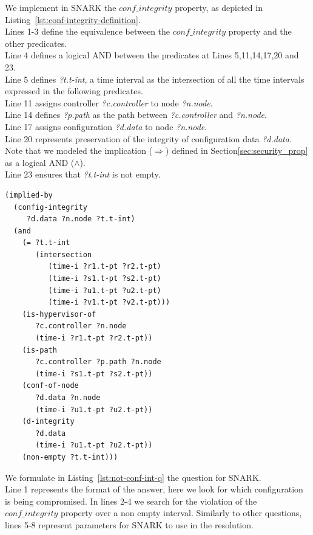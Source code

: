 We implement in SNARK the $conf\_integrity$ property, as depicted in Listing~\ref{lst:conf-integrity-definition}.\\
Lines 1-3 define the equivalence between the $conf\_integrity$ property and the other predicates.\\
Line 4 defines a logical AND between the predicates at Lines 5,11,14,17,20 and 23.\\
Line 5 defines \textit{?t.t-int}, a time interval as the intersection of all the time intervals expressed in the following predicates.\\
Line 11 assigns controller \textit{?c.controller} to node \textit{?n.node}.\\
Line 14 defines \textit{?p.path} as the path between \textit{?c.controller} and \textit{?n.node}.\\
Line 17 assigns configuration \textit{?d.data} to node \textit{?n.node}.\\
Line 20 represents preservation of the integrity of configuration data \textit{?d.data}.\\
Note that we modeled the implication ($\Rightarrow$) defined in Section\ref{sec:security_prop} as a logical AND (\ie $\wedge$).\\
Line 23 ensures that \textit{?t.t-int} is not empty.

\begin{lstlisting}[caption=SNARK definition of the configuration integrity., label=lst:conf-integrity-definition,captionpos=b] 
(implied-by
  (config-integrity 
     ?d.data ?n.node ?t.t-int)
  (and
    (= ?t.t-int
       (intersection
    	  (time-i ?r1.t-pt ?r2.t-pt)
    	  (time-i ?s1.t-pt ?s2.t-pt)
    	  (time-i ?u1.t-pt ?u2.t-pt)
    	  (time-i ?v1.t-pt ?v2.t-pt)))
    (is-hypervisor-of
       ?c.controller ?n.node 
       (time-i ?r1.t-pt ?r2.t-pt))
    (is-path 
	   ?c.controller ?p.path ?n.node
       (time-i ?s1.t-pt ?s2.t-pt))
    (conf-of-node
	   ?d.data ?n.node
       (time-i ?u1.t-pt ?u2.t-pt))
    (d-integrity
	   ?d.data
       (time-i ?u1.t-pt ?u2.t-pt))
    (non-empty ?t.t-int)))

\end{lstlisting}

We formulate in Listing~\ref{lst:not-conf-int-q} the question for SNARK.\\
Line 1 represents the format of the answer, here we look for which configuration is being compromised. In lines 2-4 we search for the violation of the $conf\_integrity$ property over a non empty interval. Similarly to other questions, lines 5-8 represent parameters for SNARK to use in the resolution.

